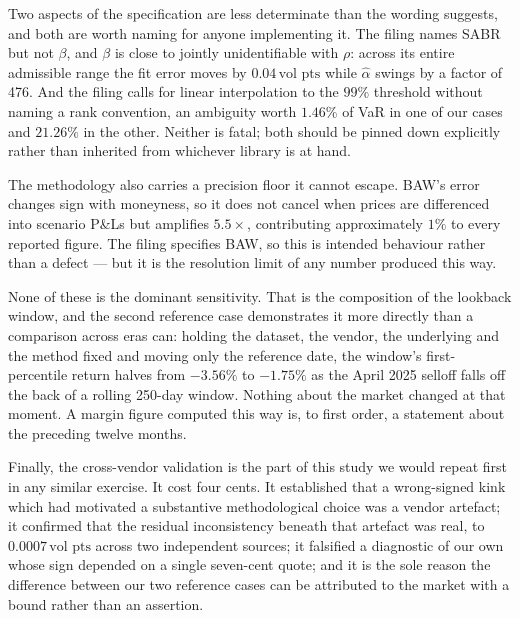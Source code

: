 \documentclass[11pt]{article}
\newcommand{\vp}{\,\text{vol pts}}
\begin{document}
Two aspects of the specification are less determinate than the wording suggests, and both
are worth naming for anyone implementing it. The filing names SABR but not $\beta$, and
$\beta$ is close to jointly unidentifiable with $\rho$: across its entire admissible
range the fit error moves by $0.04\vp$ while $\hat{\alpha}$ swings by a factor of 476.
And the filing calls for linear interpolation to the $99\%$ threshold without naming a
rank convention, an ambiguity worth $1.46\%$ of VaR in one of our cases and $21.26\%$ in
the other. Neither is fatal; both should be pinned down explicitly rather than inherited
from whichever library is at hand.

The methodology also carries a precision floor it cannot escape. BAW's error changes sign
with moneyness, so it does not cancel when prices are differenced into scenario P\&Ls but
amplifies $5.5\times$, contributing approximately $1\%$ to every reported figure. The
filing specifies BAW, so this is intended behaviour rather than a defect --- but it is
the resolution limit of any number produced this way.

None of these is the dominant sensitivity. That is the composition of the lookback
window, and the second reference case demonstrates it more directly than a comparison
across eras can: holding the dataset, the vendor, the underlying and the method fixed and
moving only the reference date, the window's first-percentile return halves from
$-3.56\%$ to $-1.75\%$ as the April 2025 selloff falls off the back of a rolling 250-day
window. Nothing about the market changed at that moment. A margin figure computed this
way is, to first order, a statement about the preceding twelve months.

Finally, the cross-vendor validation is the part of this study we would repeat first in
any similar exercise. It cost four cents. It established that a wrong-signed kink which
had motivated a substantive methodological choice was a vendor artefact; it confirmed
that the residual inconsistency beneath that artefact was real, to $0.0007\vp$ across
two independent sources; it falsified a diagnostic of our own whose sign depended on a
single seven-cent quote; and it is the sole reason the difference between our two
reference cases can be attributed to the market with a bound rather than an assertion.
\end{document}
